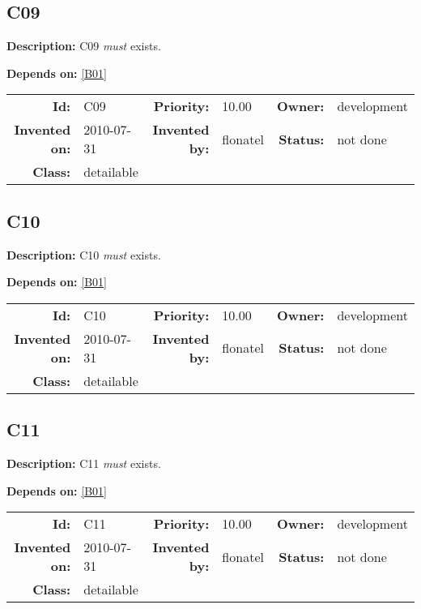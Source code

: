 \subsection{C09}\label{C09}
\textbf{Description:} C09 \textsl{must} exists.

\textbf{Depends on:} \ref{B01} 

\par
{\small \begin{center}\begin{tabular}{rlrlrl}
\textbf{Id:} & C09  & \textbf{Priority:} & 10.00  & \textbf{Owner:} & development\\ 
\textbf{Invented on:} & 2010-07-31  & \textbf{Invented by:} & flonatel  & \textbf{Status:} & not done \\ 
\textbf{Class:} & detailable  & & & \end{tabular}\end{center} }

\subsection{C10}\label{C10}
\textbf{Description:} C10 \textsl{must} exists.

\textbf{Depends on:} \ref{B01} 

\par
{\small \begin{center}\begin{tabular}{rlrlrl}
\textbf{Id:} & C10  & \textbf{Priority:} & 10.00  & \textbf{Owner:} & development\\ 
\textbf{Invented on:} & 2010-07-31  & \textbf{Invented by:} & flonatel  & \textbf{Status:} & not done \\ 
\textbf{Class:} & detailable  & & & \end{tabular}\end{center} }

\subsection{C11}\label{C11}
\textbf{Description:} C11 \textsl{must} exists.

\textbf{Depends on:} \ref{B01} 

\par
{\small \begin{center}\begin{tabular}{rlrlrl}
\textbf{Id:} & C11  & \textbf{Priority:} & 10.00  & \textbf{Owner:} & development\\ 
\textbf{Invented on:} & 2010-07-31  & \textbf{Invented by:} & flonatel  & \textbf{Status:} & not done \\ 
\textbf{Class:} & detailable  & & & \end{tabular}\end{center} }

